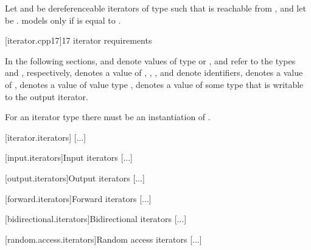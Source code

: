 \begin{addedblock}
\pnum
Let  and  be dereferenceable iterators of type 
such that  is reachable from ,
and let  be .
 models  only if
is equal to
.

[iterator.cpp17]{\Cpp{}17 iterator requirements}

\pnum
In the following sections,
and
denote values of type
 or ,
 and  refer to the
types  and
, respectively,
denotes a value of
,
,
,
and
denote identifiers,
denotes a value of
,
denotes a value of value type
,
denotes a value of some type that is writable to the output iterator.
\begin{note} For an iterator type  there must be an instantiation
of . \end{note}
\end{addedblock}

[iterator.iterators]{}
[...]

[input.iterators]{Input iterators}
[...]

[output.iterators]{Output iterators}
[...]

[forward.iterators]{Forward iterators}
[...]

[bidirectional.iterators]{Bidirectional iterators}
[...]

[random.access.iterators]{Random access iterators}
[...]

